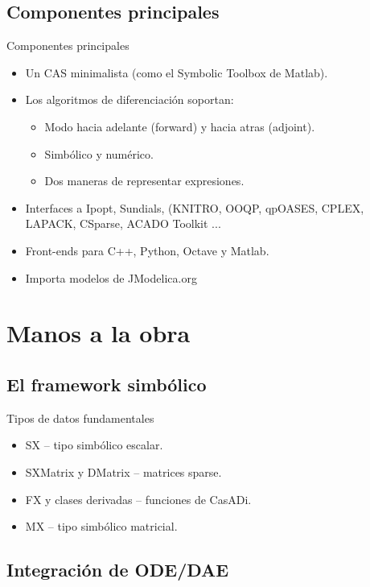 \documentclass{beamer}
\begin{document}
\subsection{Componentes principales}

\begin{frame}{Componentes principales}
    \begin{itemize}
    \item Un CAS minimalista (como el Symbolic Toolbox de Matlab).
    \item Los algoritmos de diferenciación soportan:
        \begin{itemize}
            \item Modo hacia adelante (forward) y hacia atras (adjoint).
            \item Simbólico y numérico.
            \item Dos maneras de representar expresiones.
        \end{itemize}
    \item Interfaces a Ipopt, Sundials, (KNITRO, OOQP, qpOASES, CPLEX,
LAPACK, CSparse, ACADO Toolkit ...
    \item Front-ends para C++, Python, Octave y Matlab.
    \item Importa modelos de JModelica.org
    \end{itemize}
\end{frame}

\section{Manos a la obra}

\subsection{El framework simbólico}

\begin{frame}{Tipos de datos fundamentales}
    \begin{itemize}
    \item SX – tipo simbólico escalar.
    \item SXMatrix y DMatrix – matrices sparse.
    \item FX y clases derivadas – funciones de CasADi.
    \item MX – tipo simbólico matricial.
    \end{itemize}
\end{frame}


\subsection{Integración de ODE/DAE}
\end{document}
